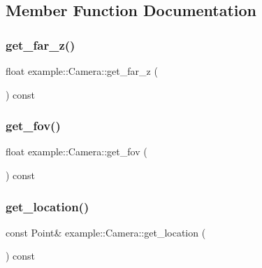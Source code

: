\subsection{Member Function Documentation}
\mbox{\label{classexample_1_1_camera_a9bdb46b1257a2fc4dc57ccdf83e2b2f7}} 
\subsubsection{get\_far\_z()}
{\footnotesize\ttfamily float example\+::\+Camera\+::get\+\_\+far\+\_\+z (\begin{DoxyParamCaption}{ }\end{DoxyParamCaption}) const\hspace{0.3cm}{\ttfamily [inline]}}

\mbox{\label{classexample_1_1_camera_a036d3963a777f5ba79dc71d8809dfa2d}} 
\subsubsection{get\_fov()}
{\footnotesize\ttfamily float example\+::\+Camera\+::get\+\_\+fov (\begin{DoxyParamCaption}{ }\end{DoxyParamCaption}) const\hspace{0.3cm}{\ttfamily [inline]}}

\mbox{\label{classexample_1_1_camera_a50cd7e64453f10fb278c399cac6dfc21}} 
\subsubsection{get\_location()}
{\footnotesize\ttfamily const Point\& example\+::\+Camera\+::get\+\_\+location (\begin{DoxyParamCaption}{ }\end{DoxyParamCaption}) const\hspace{0.3cm}{\ttfamily [inline]}}

\mbox{\label{classexample_1_1_camera_a7e95b2f8f11b40c1ab05def2f1899338}} 
